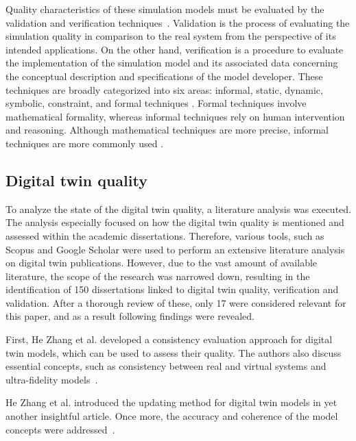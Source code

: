 \documentclass{llncs}
\begin{document}
    Quality characteristics of these simulation models must be evaluated by the validation and verification techniques~\cite{StewartSimulation,VerificationValidationSergent,OsmanBalci}. Validation is the process of evaluating the simulation quality in comparison to the real system from the perspective of its intended applications. 
    On the other hand, verification is a procedure to evaluate the implementation of the simulation model and 
    its associated data concerning the conceptual description and specifications of the model developer\cite{StewartSimulation,VerificationValidationSergent}. 
    These techniques are broadly categorized into six areas: informal, static, dynamic, 
    symbolic, constraint, and formal techniques \cite{balcicategories,balcitechniques}. Formal techniques involve mathematical formality, whereas informal techniques rely on 
    human intervention and reasoning. Although mathematical techniques are more precise, informal techniques are more commonly used \cite{balcicategories}. 

    \subsection{Digital twin quality}
    To analyze the state of the digital twin quality, a literature analysis was executed. 
    The analysis especially focused on how the digital twin quality is mentioned and assessed within the academic dissertations. Therefore, various tools, such as Scopus and Google Scholar were 
    used to perform an extensive literature analysis on digital twin publications. However, due to the vast amount of available literature, the scope of the research was narrowed down, resulting in the identification of 
    150 dissertations linked to digital twin quality, verification and validation. After a thorough review of these, only 17 were considered relevant for this paper, and as a result following findings were revealed.
  
    
    First, He Zhang et al. developed a consistency evaluation approach for digital twin models, which can be used to assess their quality. 
    The authors also discuss essential concepts, such as consistency between real and virtual systems and ultra-fidelity models~\cite{ZHANGEVALUATIONMETHOD}. 

    He Zhang et al. introduced the updating method for digital twin models in yet another insightful article.
    Once more, the accuracy and coherence of the model concepts were addressed~\cite{ZHANGUPDATEMETHOD}.
\end{document}

